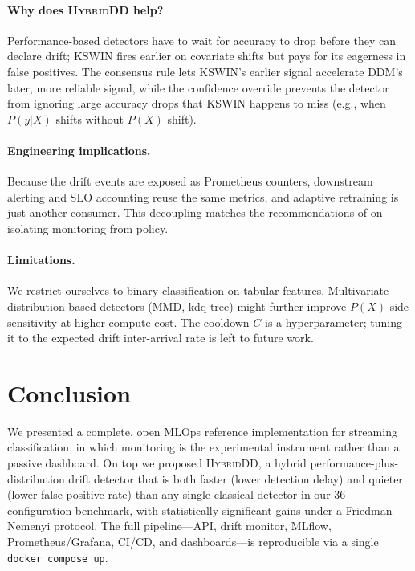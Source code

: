 \documentclass[conference]{IEEEtran}
\begin{document}
\paragraph*{Why does \textsc{HybridDD} help?} Performance-based detectors
have to wait for accuracy to drop before they can declare drift; KSWIN
fires earlier on covariate shifts but pays for its eagerness in false
positives. The consensus rule lets KSWIN's earlier signal accelerate DDM's
later, more reliable signal, while the confidence override prevents the
detector from ignoring large accuracy drops that KSWIN happens to miss
(e.g., when $P(y|X)$ shifts without $P(X)$ shift).

\paragraph*{Engineering implications.} Because the drift events are
exposed as Prometheus counters, downstream alerting and
SLO accounting reuse the same metrics, and adaptive retraining is just
another consumer. This decoupling matches the recommendations of
\cite{breck2017tfx} on isolating monitoring from policy.

\paragraph*{Limitations.} We restrict ourselves to binary classification
on tabular features. Multivariate distribution-based detectors
(MMD, kdq-tree) might further improve $P(X)$-side sensitivity at higher
compute cost. The cooldown $C$ is a hyperparameter; tuning it to the
expected drift inter-arrival rate is left to future work.

\section{Conclusion}
\label{sec:conclusion}

We presented a complete, open MLOps reference implementation for streaming
classification, in which monitoring is the experimental instrument rather than
a passive dashboard. On top we proposed \textsc{HybridDD}, a hybrid
performance-plus-distribution drift detector that is both faster (lower
detection delay) and quieter (lower false-positive rate) than any single
classical detector in our 36-configuration benchmark, with statistically
significant gains under a Friedman--Nemenyi protocol. The full pipeline---API,
drift monitor, MLflow, Prometheus/Grafana, CI/CD, and dashboards---is
reproducible via a single \verb|docker compose up|.




\end{document}
